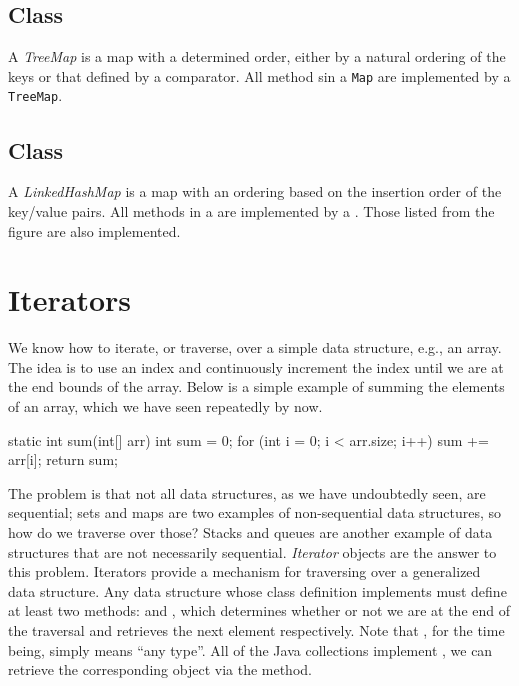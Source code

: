 \subsection*{ Class}
A \textit{TreeMap} is a map with a determined order, either by a natural ordering of the keys or that defined by a comparator. All method sin a \texttt{Map} are implemented by a \texttt{TreeMap}.

\subsection*{ Class}
A \textit{LinkedHashMap} is a map with an ordering based on the insertion order of the key/value pairs. All methods in a  are implemented by a . Those listed from the  figure are also implemented.

\section*{Iterators}
We know how to iterate, or traverse, over a simple data structure, e.g., an array. The idea is to use an index and continuously increment the index until we are at the end bounds of the array. Below is a simple example of summing the elements of an array, which we have seen repeatedly by now.

\begin{verbnobox}[\footnotesize]
static int sum(int[] arr) {
  int sum = 0;
  for (int i = 0; i < arr.size; i++) { sum += arr[i]; }
  return sum;
}
\end{verbnobox}

The problem is that not all data structures, as we have undoubtedly seen, are sequential; sets and maps are two examples of non-sequential data structures, so how do we traverse over those? Stacks and queues are another example of data structures that are not necessarily sequential. \textit{Iterator} objects are the answer to this problem. Iterators provide a mechanism for traversing over a generalized data structure. Any data structure whose class definition implements  must define at least two methods:  and , which determines whether or not we are at the end of the traversal and retrieves the next element respectively. Note that , for the time being, simply means ``any type''. All of the Java collections implement , we can retrieve the corresponding  object via the  method. 

